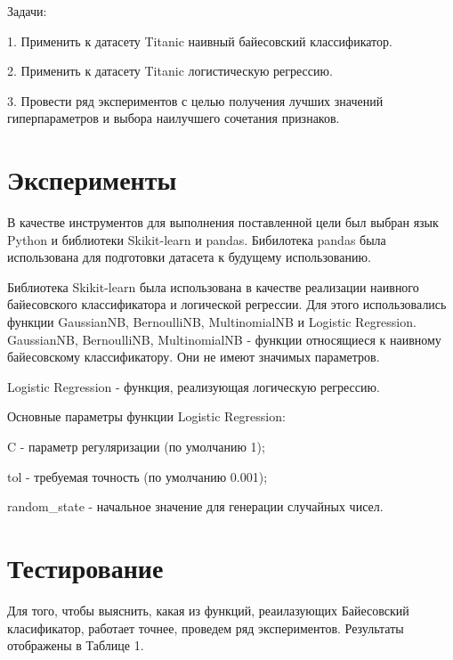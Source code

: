 \documentclass[a4paper,12pt]{article}
\begin{document}
	\vspace{0.5cm}
	Задачи: 
	
	\vspace{0.5cm}
	1. Применить к датасету Titanic наивный байесовский классификатор.
	
	\vspace{0.5cm}
	2. Применить к датасету Titanic логистическую регрессию.

	\vspace{0.5cm}
	3. Провести ряд экспериментов с целью получения лучших значений гиперпараметров и выбора наилучшего сочетания признаков.
	
\newpage\section{Эксперименты} 
	В качестве инструментов для выполнения поставленной цели был выбран язык Python и библиотеки Skikit-learn и pandas.
	Бибилотека pandas была использована для подготовки датасета к будущему использованию.
	
	\vspace{0.5cm}
	Библиотека Skikit-learn была использована  в качестве реализации наивного байесовского классификатора и логической регрессии. Для этого использовались функции GaussianNB, BernoulliNB, MultinomialNB и Logistic Regression. GaussianNB, BernoulliNB, MultinomialNB - функции относящиеся к наивному байесовскому классификатору. Они не имеют значимых параметров.
	
	\vspace{0.5cm}
	Logistic Regression - функция, реализующая логическую регрессию.
	
	\vspace{0.5cm}
	Основные параметры функции Logistic Regression:
	
	\vspace{0.5cm}
	C - параметр регуляризации (по умолчанию 1);

	\vspace{0.5cm}
	tol - требуемая точность (по умолчанию 0.001);
	
	\vspace{0.5cm}
	random\_state - начальное значение для генерации случайных чисел.


	
\newpage\section{Тестирование}
	Для того, чтобы выяснить, какая из функций, реаилазующих Байесовский класификатор, работает точнее, проведем ряд экспериментов. Результаты отображены в Таблице 1.
	
\end{document}
